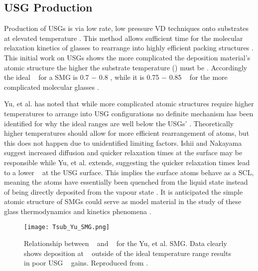 \documentclass[draft,a4paper,12pt,oneside]{report}%
\begin{document}
\subsection{USG Production}
Production of USGs is via low rate, low pressure VD techniques onto substrates at elevated temperature \cite{Ishii2014, Aji2013, Yu2013, Wang2014, Nakayama2013}. This method allows sufficient time for the molecular relaxation kinetics of glasses to rearrange into highly efficient packing structures \cite{Aji2013, Swallen2007, Wang2014}. This initial work on USGs shows the more complicated the deposition material's atomic structure the higher the substrate temperature (\Tsub) must be \cite{Yu2013}. Accordingly the ideal \Tsub~ for a SMG is 0.7 $-$ 0.8 \Tg, while it is 0.75 $-$ 0.85 \Tg~ for the more complicated molecular glasses \cite{Swallen2007, Dawson2011, Yu2013, Dawson2010, Kearns2008}. 
 
Yu, et al. \cite{Yu2013} has noted that while more complicated atomic structures require higher temperatures to arrange into USG configurations no definite mechanism has been identified for why the ideal ranges are well below the USGs' \Tg. Theoretically higher temperatures should allow for more efficient rearrangement of atoms, but this does not happen due to unidentified limiting factors. Ishii and Nakayama \cite{Ishii2014} suggest increased diffusion and quicker relaxation times at the surface may be responsible while Yu, et al. \cite{Yu2013} extends, suggesting the quicker relaxation times lead to a lower \Tg~ at the USG surface. This implies the surface atoms behave as a SCL, meaning the atoms have essentially been quenched from the liquid state instead of being directly deposited from the vapour state \cite{Yu2013}. It is anticipated the simple atomic structure of SMGs could serve as model material in the study of these glass thermodynamics and kinetics phenomena \cite{Yu2013, Wang2014}. 

\begin{figure}[htbp]
	\centering
	\texttt{[image: Tsub\_Yu\_SMG.png]}
	\caption[\Tsub~ and \dTg~ Relationship]{Relationship between \Tsub~ and \dTg~ for the Yu, et al. \cite{Yu2013} SMG. Data clearly shows deposition at  \Tsub~ outside of the ideal temperature range results in poor USG \dTg~ gains. Reproduced from \cite{Yu2013}.}
	\label{fig:YuTsub}
\end{figure}
\end{document}
